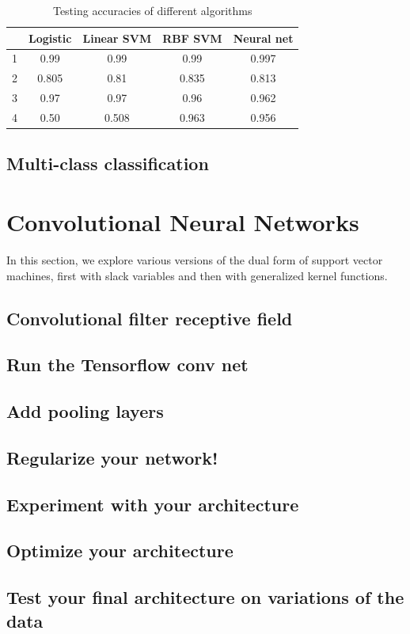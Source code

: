 \documentclass{article}
\begin{document}
\begin{table}
  \begin{center}
    \begin{tabular}{ | c | c | c | c | c | }
      \hline
          & Logistic   & Linear SVM   & RBF SVM    & Neural net \\ \hline
      1   & 0.99       & 0.99         & 0.99       & 0.997        \\ \hline
      2   & 0.805      & 0.81         & 0.835      & 0.813        \\ \hline
      3   & 0.97       & 0.97         & 0.96       & 0.962        \\ \hline
      4   & 0.50       & 0.508        & 0.963      & 0.956        \\ \hline
    \end{tabular}
  \end{center}
  \caption{Testing accuracies of different algorithms}
\end{table}





\subsection{Multi-class classification}



\section{Convolutional Neural Networks}
In this section, we explore various versions of the dual form of support vector machines, first with slack variables and then with generalized kernel functions.

\subsection{Convolutional filter receptive field}

\subsection{Run the Tensorflow conv net}

\subsection{Add pooling layers}

\subsection{Regularize your network!}

\subsection{Experiment with your architecture}

\subsection{Optimize your architecture}

\subsection{Test your final architecture on variations of the data}
\end{document}
